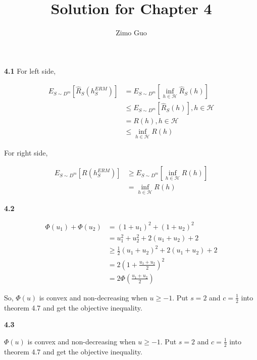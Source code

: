 \documentclass[12pt]{article}
\title{Solution for Chapter 4}
\author{Zimo Guo}
\date{}
\begin{document}
\maketitle

\noindent \textbf{4.1}
For left side, 

\begin{align*}
    E_{S \sim D^{m}}[\hat{R}_{S}(h_{S}^{ERM})] &= E_{S \sim D^{m}}[\inf \limits_{h \in \mathcal{H}} \hat{R}_{S}(h)] \\
    &\le E_{S \sim D^{m}}[\hat{R}_{S}(h)], h \in \mathcal{H} \\
    &= R(h), h \in \mathcal{H} \\
    &\le \inf \limits_{h \in \mathcal{H}}R(h)
\end{align*}

For right side, 

\begin{align*}
    E_{S \sim D^{m}}[R(h_{S}^{ERM})]
    &\ge E_{S \sim D^{m}}[\inf\limits_{h \in \mathcal{H}}R(h)] \\
    &= \inf\limits_{h \in \mathcal{H}}R(h) 
\end{align*}

\vspace{1em}  %

\noindent \textbf{4.2}

\begin{align*}
    \Phi(u_{1}) + \Phi(u_{2}) &= (1+u_{1})^2 + (1+u_{2})^2 \\
    &= u_{1}^2 + u_{2}^2 + 2(u_{1} + u_{2}) + 2 \\
    &\ge \frac{1}{2} (u_{1} + u_{2})^2 + 2(u_{1} + u_{2}) + 2 \\
    &= 2(1 + \frac{u_{1}+u_{2}}{2})^2 \\
    &= 2\Phi(\frac{u_{1}+u_{2}}{2})
\end{align*}

So, $\Phi(u)$ is convex and non-decreasing when $u \ge -1$. Put $s=2$ and $c=\frac{1}{2}$ into
theorem 4.7 and get the objective inequality.

\vspace{1em}  %

\noindent \textbf{4.3}

$\Phi(u)$ is convex and non-decreasing when $u \ge -1$. Put $s=2$ and $c=\frac{1}{2}$ into
theorem 4.7 and get the objective inequality.

\vspace{1em}  %
\end{document}
